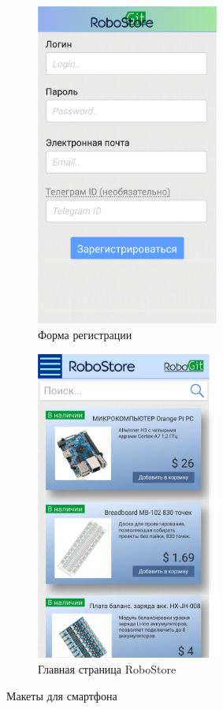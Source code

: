 \documentclass[12pt, a4paper]{article}
\begin{document}
\begin{figure}
  \centering
  \begin{subfigure}[b]{0.47\textwidth}
    \includegraphics[width=6cm]{png/sign_smart.png}
    \caption{Форма регистрации}
  \end{subfigure}
  \begin{subfigure}[b]{0.47\textwidth}
    \includegraphics[width=6cm]{png/store_main_smart.png}
    \caption{Главная страница RoboStore}
  \end{subfigure}
  \caption{Макеты для смартфона }
\end{figure}
\end{document}
